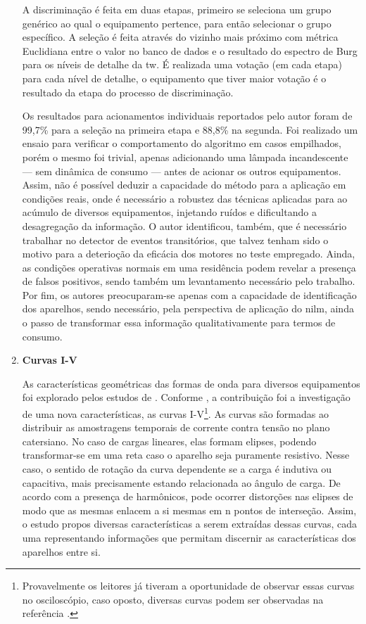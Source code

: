 \begin{enumerate}[label=\textbf{2.\arabic*},wide=\parindent]
A discriminação é feita em duas etapas, primeiro se seleciona um grupo
genérico ao qual o equipamento pertence, para então selecionar o grupo
específico. A seleção é feita através do vizinho mais próximo com
métrica Euclidiana entre o valor no banco de dados e o resultado do
espectro de Burg para os níveis de detalhe da \gls{tw}. É realizada
uma votação (em cada etapa) para cada nível de detalhe, o equipamento
que tiver maior votação é o resultado da etapa do processo de
discriminação.

Os resultados para acionamentos individuais reportados pelo autor
foram de 99,7\% para a seleção na primeira etapa e 88,8\% na segunda.
Foi realizado um ensaio para verificar o comportamento do algoritmo em
casos empilhados, porém o mesmo foi trivial, apenas
adicionando uma lâmpada incandescente --- sem dinâmica de consumo --- 
antes de acionar os outros equipamentos.  Assim, não é possível
deduzir a capacidade do método para a aplicação em condições reais,
onde é necessário a robustez das técnicas aplicadas para ao
acúmulo de diversos equipamentos, injetando ruídos e dificultando
a desagregação da informação. O autor identificou, também, que é
necessário trabalhar no detector de eventos transitórios, que talvez
tenham sido o motivo para a deterioção da eficácia dos motores no
teste empregado. Ainda, as condições operativas normais em uma
residência podem revelar a presença de falsos positivos, sendo também
um levantamento necessário pelo trabalho. Por fim, os autores
preocuparam-se apenas com a capacidade de identificação dos aparelhos,
sendo necessário, pela perspectiva de aplicação do \gls{nilm}, ainda o
passo de transformar essa informação qualitativamente para termos de
consumo.

\item \textbf{Curvas I-V}
\label{nilm:curvas_iv}

As características geométricas das formas de onda para diversos
equipamentos foi explorado pelos estudos de
\citet{nilm_lee_2004_32,nilm_lam_2007_33}. Conforme
\cite{nilm_zeifman_review_2011}, a contribuição foi a investigação de
uma nova características, as curvas I-V\footnote{Provavelmente os
leitores já tiveram a oportunidade de observar essas curvas no
osciloscópio, caso oposto, diversas curvas podem ser observadas 
na referência \cite{nilm_lam_2007_33}.}. As curvas são formadas ao
distribuir as amostragens temporais de corrente contra tensão no plano
catersiano. No caso de cargas lineares, elas formam elipses, podendo
transformar-se em uma reta caso o aparelho seja puramente resistivo.
Nesse caso, o sentido de rotação da curva dependente se a carga é
indutiva ou capacitiva, mais precisamente estando relacionada ao
ângulo de carga. De acordo com a presença de harmônicos, pode ocorrer
distorções nas elipses de modo que as mesmas enlacem a si mesmas em n
pontos de interseção.  Assim, o estudo propos diversas características
a serem extraídas dessas curvas, cada uma representando
informações que permitam discernir as características dos aparelhos
entre si.


\end{enumerate}
